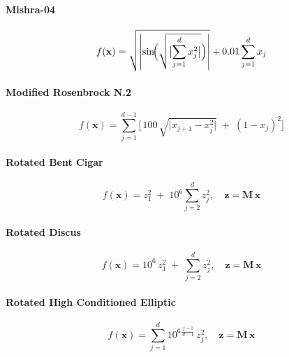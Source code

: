 \vspace{.095em}
\paragraph{Mishra-04}
\begin{equation}
f(\mathbf{x})
= \sqrt{\left|\sin\!\Bigl(\sqrt{\bigl|\sum_{j=1}^d x_j^2\bigr|}\Bigr)\right|}
  + 0.01 \sum_{j=1}^d x_j
\label{ben:Mishra04}
\end{equation}

\vspace{.095em}
\paragraph{Modified Rosenbrock N.2}
\begin{equation}
f(\mathbf{x})
= \sum_{j=1}^{d-1}\bigl[\,100\,\sqrt{\lvert x_{j+1} - x_j^2\rvert}\;+\;(1 - x_j)^2\bigr]
\label{ben:RosenbrockModified02}
\end{equation}

\vspace{.095em}
\paragraph{Rotated Bent Cigar}
\begin{equation}
f(\mathbf{x})
= z_1^2 \;+\; 10^6 \sum_{j=2}^d z_j^2,
\quad \mathbf{z} = \mathbf{M}\,\mathbf{x}
\label{ben:RotatedBentCigar}
\end{equation}

\vspace{.095em}
\paragraph{Rotated Discus}
\begin{equation}
f(\mathbf{x})
= 10^6\,z_1^2 \;+\; \sum_{j=2}^d z_j^2,
\quad \mathbf{z} = \mathbf{M}\,\mathbf{x}
\label{ben:RotatedDiscus}
\end{equation}

\enlargethispage{\baselineskip}
\vspace{.095em}
\paragraph{Rotated High Conditioned Elliptic}
\begin{equation}
f(\mathbf{x})
= \sum_{j=1}^d 10^{6\,\frac{j-1}{d-1}}\,z_j^2,
\quad \mathbf{z} = \mathbf{M}\,\mathbf{x}
\label{ben:RotatedHighConditionedElliptic}
\end{equation}


